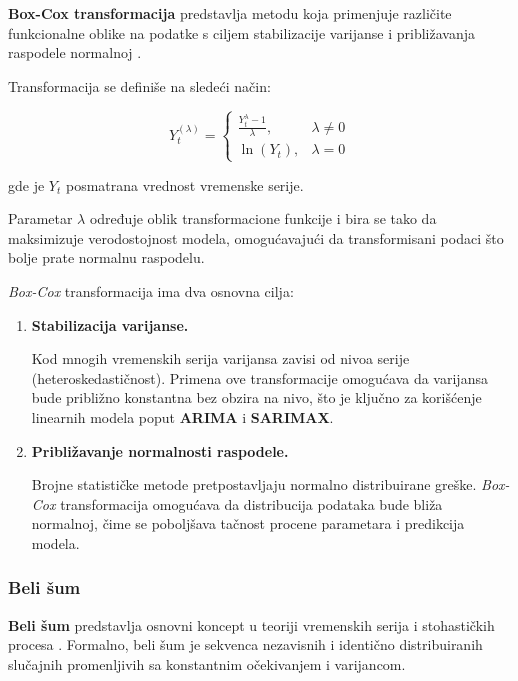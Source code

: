 \documentclass[12pt]{article}
\begin{document}
\textbf{Box-Cox transformacija} predstavlja metodu koja primenjuje različite funkcionalne oblike na podatke s ciljem stabilizacije varijanse i približavanja raspodele normalnoj \cite{boxcox1964}.

\bigskip

Transformacija se definiše na sledeći način:

$$
Y_t^{(\lambda)} =
\begin{cases}
\frac{Y_t^{\lambda} - 1}{\lambda}, & \lambda \neq 0 \\[6pt]
\ln(Y_t), & \lambda = 0
\end{cases}
$$

gde je $Y_t$ posmatrana vrednost vremenske serije.

\bigskip

Parametar $\lambda$ određuje oblik transformacione funkcije i bira se tako da maksimizuje verodostojnost modela, omogućavajući da transformisani podaci što bolje prate normalnu raspodelu.

\bigskip

\textit{Box-Cox} transformacija ima dva osnovna cilja:

\begin{enumerate}
\item \textbf{Stabilizacija varijanse.}

Kod mnogih vremenskih serija varijansa zavisi od nivoa serije (heteroskedastičnost). Primena ove transformacije omogućava da varijansa bude približno konstantna bez obzira na nivo, što je ključno za korišćenje linearnih modela poput \textbf{ARIMA} i \textbf{SARIMAX}.

\item \textbf{Približavanje normalnosti raspodele.}

Brojne statističke metode pretpostavljaju normalno distribuirane greške. \textit{Box-Cox} transformacija omogućava da distribucija podataka bude bliža normalnoj, čime se poboljšava tačnost procene parametara i predikcija modela.
\end{enumerate}

\subsubsection{Beli šum}

\textbf{Beli šum} predstavlja osnovni koncept u teoriji vremenskih serija i stohastičkih procesa \cite{box1970, brockwell2002}. Formalno, beli šum je sekvenca nezavisnih i identično distribuiranih slučajnih promenljivih sa konstantnim očekivanjem i varijancom.
\end{document}
